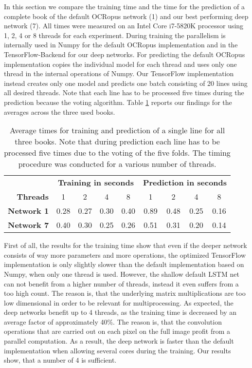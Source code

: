 \documentclass{jlcl}
\begin{document}
In this section we compare the training time and the time for the prediction of a complete book of the default OCRopus network (1) and our best performing deep network (7).
All times were measured on an Intel Core i7-5820K processor using 1, 2, 4 or 8 threads for each experiment.
During training the parallelism is internally used in Numpy for the default OCRopus implementation and in the TensorFlow-Backend for our deep networks.
For predicting the default OCRopus implementation copies the individual model for each thread and uses only one thread in the internal operations of Numpy.
Our TensorFlow implementation instead creates only one model and predicts one batch consisting of 20 lines using all desired threads.
Note that each line has to be processed five times during the prediction because the voting algorithm.
Table \ref{tab:timing} reports our findings for the averages across the three used books.

\begin{table}[t]
    \centering
    \caption{Average times for training and prediction of a single line for all three books.
    Note that during prediction each line has to be processed five times due to the voting of the five folds.
    The timing procedure was conducted for a various number of threads.}
    \label{tab:timing}
    \begin{tabular}{r|cccc|cccc}
        \hline
                         & \multicolumn{4}{c|}{\textbf{Training in seconds}} & \multicolumn{4}{c}{\textbf{Prediction in seconds}} \\
        \textbf{Threads} & 1    & 2    & 4    & 8    & 1   & 2   & 4   & 8 \\
        \hline
        \textbf{Network 1} & 0.28 & 0.27 & 0.30 & 0.40 & 0.89 & 0.48 & 0.25 & 0.16 \\
        \textbf{Network 7} & 0.40 & 0.30 & 0.25 & 0.26 & 0.51 & 0.31 & 0.20 & 0.14 \\
        \hline
    \end{tabular}
\end{table}

First of all, the results for the training time show that even if the deeper network consists of way more parameters and more operations, the optimized TensorFlow implementation is only slightly slower than the default implementation based on Numpy, when only one thread is used.
However, the shallow default LSTM net can not benefit from a higher number of threads, instead it even suffers from a too high count.
The reason is, that the underlying matrix multiplications are too low dimensional in order to be relevant for multiprocessing.
As expected, the deep networks benefit up to 4 threads, as the training time is decreased by an average factor of approximately 40\%.
The reason is, that the convolution operations that are carried out on each pixel on the full image profit from a parallel computation.
As a result, the deep network is faster than the default implementation when allowing several cores during the training.
Our results show, that a number of 4 is sufficient.
\end{document}
